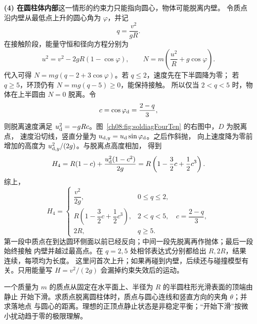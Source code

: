 {\begin{xesolution}
\textbf{(4) 在圆柱体内部}\quad 这一情形的约束力只能指向圆心，物体可能脱离内壁。
令质点沿内壁从最低点上升的圆心角为 $\varphi$，并记
\[
 q=\frac{v^2}{gR}.
\]
在接触阶段，能量守恒和径向方程分别为
\[
 u^2=v^2-2gR(1-\cos\varphi),
 \qquad
 N=m\left(\frac{u^2}{R}+g\cos\varphi\right).
\]
代入可得 $N=mg(q-2+3\cos\varphi)$。若 $q\le2$，速度先在下半圆降为零；
若 $q\ge5$，环顶仍有 $N=mg(q-5)\ge0$，能保持接触。
所以仅当 $2<q<5$ 时，物体在上半圆由 $N=0$ 脱离。令
\[
 c=\cos\varphi_{\rm d}=\frac{2-q}{3},
\]
则脱离速度满足 $u_{\rm d}^2=-gRc$。图~\ref{ch08:fig:soldiagFourTen} 的右图中，$D$ 为脱离点，
速度沿切线，竖直分量为 $u_{{\rm d},y}=u_{\rm d}\sin\varphi_{\rm d}$。之后作斜抛，
向上速度降为零前增加的高度为 $u_{{\rm d},y}^2/(2g)$。与脱离点高度相加，
得到
\[
 H_4
 =R(1-c)+\frac{u_{\rm d}^2(1-c^2)}{2g}
 =R\left(1-\frac32c+\frac12c^3\right).
\]
\soldiagFourTen
综上，
\[
 \boxed{
 H_4=
 \begin{cases}
 \dfrac{v^2}{2g},&0\le q\le2,\\[6pt]
 R\left(1-\dfrac32c+\dfrac12c^3\right),
   &2<q<5,\quad c=\dfrac{2-q}{3},\\[6pt]
 2R,&q\ge5.
 \end{cases}}
\]
第一段中质点在到达圆环侧面以前已经反向；中间一段先脱离再作抛体；最后一段始终接触
内壁并越过最高点。在 $q=2,5$ 处相邻表达式分别都给出 $R,2R$，结果连续，每项均为长度。
这里问首次上升；如果再碰到内壁，后续还与碰撞模型有关。只用能量写 $H=v^2/(2g)$ 会漏掉约束失效后的运动。
\end{xesolution}

\begin{origexamplebox}{}\label{ch08:ex:s11-4-11}
一个质量为 $m$ 的质点从固定在水平面上、半径为 $R$ 的半圆柱形光滑表面的顶端由静止
开始下滑。求质点脱离圆柱体时，质点与圆心连线和竖直方向的夹角 $\theta$；并求落地点
与圆心的距离。理想的正顶点静止状态是非稳定平衡；“开始下滑”按微小扰动趋于零的极限理解。
\probdiagFourEleven
\end{origexamplebox}

}
